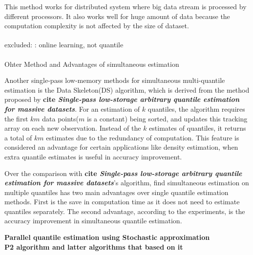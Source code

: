 \documentclass[12pt]{article}
\begin{document}
\begin{enumerate}
        This method works for distributed system where big data stream is processed by different processors. It also works well for huge amount of data because the computation complexity is not affected by the size of dataset.
        \\\\
        excluded: \cite{pebayFormulasRobustOnepass2008}: online learning, not quantile\\\\


        Ohter Method and Advantages of simultaneous estimation\cite{mcdermottDataSkeletonsSimultaneous2007}

        Another single-pass low-memory methods for simultaneous multi-quantile estimation is the Data Skeleton(DS)\cite{mcdermottDataSkeletonsSimultaneous2007} algorithm, which is derived from the method proposed by \textbf{cite \textit{Single-pass low-storage arbitrary quantile estimation for massive datasets}}. For an estimation of $k$ quantiles, the algorithm requires the first $km$ data points($m$ is a constant) being sorted, and updates this tracking array on each new observation. Instead of the $k$ estimates of quantiles, it returns a total of $km$ estimates due to the redundancy of computation. This feature is considered an advantage for certain applications like density estimation, when extra quantile estimates is useful in accuracy improvement.

        Over the comparison with \textbf{cite \textit{Single-pass low-storage arbitrary quantile estimation for massive datasets}}'s algorithm, \citeauthor{mcdermottDataSkeletonsSimultaneous2007}\cite{mcdermottDataSkeletonsSimultaneous2007} find simultaneous estimation on multiple quantiles has two main advantages over single quantile estimation methods. First is the save in computation time as it does not need to estimate quantiles separately. The second advantage, according to the experiments, is the accuracy improvement in simultaneous quantile estimation.  


        
        \textbf{
            Parallel quantile estimation using Stochastic approximation \cite{hammerSmoothEstimatesMultiple2019}
        }
        \\
        \textbf{P2 algorithm and latter algorithms that based on it}


\end{enumerate}
\end{document}
